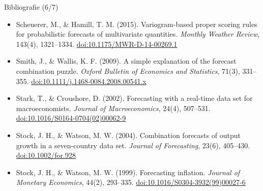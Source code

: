 \begin{frame}{Bibliografie (6/7)}
\begin{itemize}
    \item Scheuerer, M., \& Hamill, T. M. (2015). Variogram-based proper scoring rules for probabilistic forecasts of multivariate quantities. \textit{Monthly Weather Review}, 143(4), 1321--1334. \href{https://doi.org/10.1175/MWR-D-14-00269.1}{doi:10.1175/MWR-D-14-00269.1}
    \item Smith, J., \& Wallis, K. F. (2009). A simple explanation of the forecast combination puzzle. \textit{Oxford Bulletin of Economics and Statistics}, 71(3), 331--355. \href{https://doi.org/10.1111/j.1468-0084.2008.00541.x}{doi:10.1111/j.1468-0084.2008.00541.x}
    \item Stark, T., \& Croushore, D. (2002). Forecasting with a real-time data set for macroeconomists. \textit{Journal of Macroeconomics}, 24(4), 507--531. \href{https://doi.org/10.1016/S0164-0704(02)00062-9}{doi:10.1016/S0164-0704(02)00062-9}
    \item Stock, J. H., \& Watson, M. W. (2004). Combination forecasts of output growth in a seven-country data set. \textit{Journal of Forecasting}, 23(6), 405--430. \href{https://doi.org/10.1002/for.928}{doi:10.1002/for.928}
    \item Stock, J. H., \& Watson, M. W. (1999). Forecasting inflation. \textit{Journal of Monetary Economics}, 44(2), 293--335. \href{https://doi.org/10.1016/S0304-3932(99)00027-6}{doi:10.1016/S0304-3932(99)00027-6}
\end{itemize}
\end{frame}


